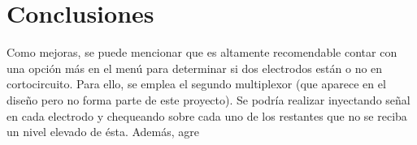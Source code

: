 \section{Conclusiones}
Como mejoras, se puede mencionar que es altamente recomendable contar con una opción más en el menú para determinar si dos electrodos están o no en cortocircuito. Para ello, se emplea el segundo multiplexor (que aparece en el diseño pero no forma parte de este proyecto). Se podría realizar inyectando señal en cada electrodo y chequeando sobre cada uno de los restantes que no se reciba un nivel elevado de ésta. Además, agre

